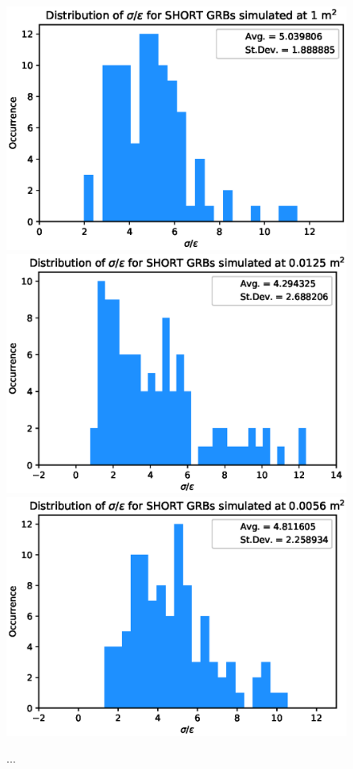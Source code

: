 \documentclass[]{spie}  %
\begin{document}
\begin{figure}[h!]
\includegraphics[scale=0.5,angle=0]{fig/SHORT/ratio_distrib_1.eps}\\
\includegraphics[scale=0.5,angle=0]{fig/SHORT/ratio_distrib_0.0125.eps}
\includegraphics[scale=0.5,angle=0]{fig/SHORT/ratio_distrib_0.0056.eps}\\

\caption{...}
\label{fig:ratio_distribution_Short}
\end{figure}
\end{document}

